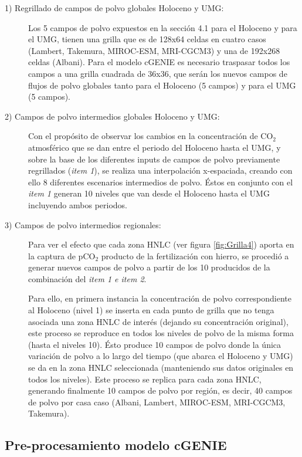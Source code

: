 \begin{description}
  \item[1) Regrillado de campos de polvo globales Holoceno y UMG:]

Los 5 campos de polvo expuestos en la sección 4.1 para el Holoceno y para el UMG, tienen una grilla que es de 128x64 celdas en cuatro casos (Lambert, Takemura, MIROC-ESM, MRI-CGCM3) y una de 192x268 celdas (Albani). Para el modelo cGENIE es necesario traspasar todos los campos a una grilla cuadrada de 36x36, que serán los nuevos campos de flujos de polvo globales tanto para el Holoceno (5 campos) y para el UMG (5 campos). 

  \item[2) Campos de polvo intermedios globales Holoceno y UMG:]

Con el propósito de observar los cambios en la concentración de CO$_2$ atmosférico que se dan entre el periodo del Holoceno hasta el UMG, y sobre la base de los diferentes inputs de campos de polvo previamente regrillados (\textit{item 1}), se realiza una interpolación x-espaciada, creando con ello 8 diferentes escenarios intermedios de polvo. Éstos en conjunto con el \textit{item 1} generan 10 niveles que van desde el Holoceno hasta el UMG incluyendo ambos periodos.

   \item[3) Campos de polvo intermedios regionales:]

Para ver el efecto que cada zona HNLC (ver figura \ref{fig:Grilla4}) aporta en la captura de pCO$_2$ producto de la fertilización con hierro, se procedió a generar nuevos campos de polvo a partir de los 10 producidos de la combinación del \textit{item 1 e item 2}. 

Para ello, en primera instancia la concentración de polvo correspondiente al Holoceno (nivel 1) se inserta en cada punto de grilla que no tenga asociada una zona HNLC de interés (dejando su concentración original), este proceso se reproduce en todos los niveles de polvo de la misma forma (hasta el niveles 10). Ésto produce 10 campos de polvo donde la única variación de polvo a lo largo del tiempo (que abarca el Holoceno y UMG) se da en la zona HNLC seleccionada (manteniendo sus datos originales en todos los niveles). Este proceso se replica para cada zona HNLC, generando finalmente 10 campos de polvo por región, es decir, 40 campos de polvo por casa caso (Albani, Lambert, MIROC-ESM, MRI-CGCM3, Takemura). 
\end{description}

\subsection{Pre-procesamiento modelo cGENIE}

